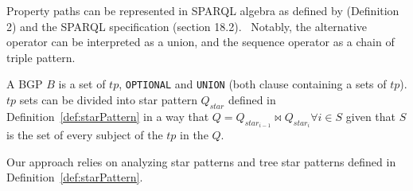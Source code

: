 Property paths can be represented in SPARQL algebra as defined by \citeauthor{Kostylev2015} (Definition 2) and the SPARQL specification (section 18.2).~
Notably, the alternative operator can be interpreted as a union, and the sequence operator as a chain of triple pattern.

\begin{definition}[BGP]\label{def:bgp}
 A BGP $B$ is a set of $tp$, \texttt{OPTIONAL} and \texttt{UNION} (both clause containing a sets of $tp$).
 $tp$ sets can be divided into star pattern $Q_{star}$ defined in Definition~\ref{def:starPattern} in a way 
 that $Q = Q_{star_{i-1}} \bowtie Q_{star_i} \forall i \in S$ given that $S$ is the set of every subject of the $tp$ in the $Q$.
\end{definition}
\fi

Our approach relies on analyzing star patterns and tree star patterns defined in Definition~\ref{def:starPattern}.

